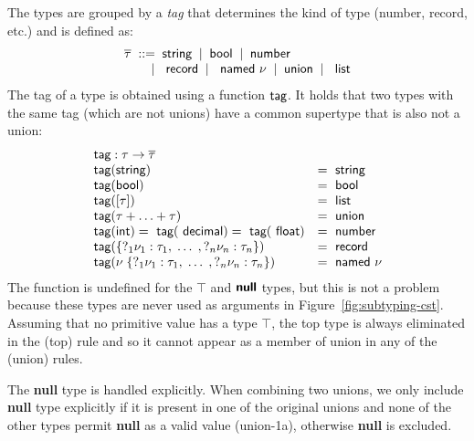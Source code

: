 \documentclass[10pt]{sigplanconf}
\newcommand{\lsep}[0]{\;\; | \;\;}
\newcommand{\kvd}[1]{\textbf{\sffamily #1}}
\newcommand{\ident}[1]{\textnormal{\sffamily #1}}
\newcommand{\tytag}{\overline{\tau}}
\newcommand{\tytagof}{\ident{tag}}
\begin{document}
The types are grouped by a \emph{tag} that determines the kind of type (number, record, etc.)
and is defined as:
%
\begin{equation*}
\begin{array}{rl}
\multicolumn{2}{l}{
\tytag \; ::= \; \ident{string} \lsep \ident{bool} \lsep \ident{number} 
}\\  
\;\;  &\lsep \ident{record} \lsep \ident{named}~\nu \lsep \ident{union} \lsep \ident{list}
\end{array}
\end{equation*}
%
The tag of a type is obtained using a function $\tytagof$. It holds that two types with the 
same tag (which are not unions) have a common supertype that is also not a union:
%
\begin{equation*}
\begin{array}{ll}
\tytagof : \tau \rightarrow \tytag\\
\tytagof(\ident{string}) &= \ident{string}\\
\tytagof(\ident{bool}) &= \ident{bool}\\
\tytagof([\tau]) &= \ident{list}\\
\tytagof(\tau + \ldots + \tau) &= \ident{union}\\
\tytagof(\ident{int}) = \tytagof(\ident{decimal}) = \tytagof(\ident{float}) &= \ident{number}\\
\tytagof(\{ ?_1 \nu_1 : \tau_1, \; \ldots \; , ?_n \nu_n : \tau_n \}) &= \ident{record}\\
\tytagof(\nu\; \{ ?_1 \nu_1 : \tau_1, \; \ldots \; , ?_n \nu_n : \tau_n \}) &= \ident{named}~\nu
\end{array}
\end{equation*}
%
The function is undefined for the $\top$ and $\kvd{null}$ types, but this is not a 
problem because these types are never used as arguments in Figure~\ref{fig:subtyping-cst}.
Assuming that no primitive value has a type $\top$, the top type is always eliminated in the
(top) rule and so it cannot appear as a member of union in any of the (union) rules.

The \kvd{null} type is handled explicitly. When combining two unions, we only include 
\kvd{null} type explicitly if it is present in one of the original unions and none of the 
other types permit \kvd{null} as a valid value (union-1a), otherwise \kvd{null} is excluded.
\end{document}
